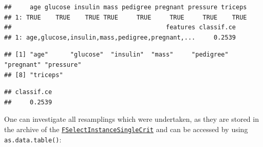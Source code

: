 \documentclass[
]{scrbook}
\newenvironment{Shaded}{\begin{snugshade}}{\end{snugshade}}
\newcommand{\CommentTok}[1]{\textcolor[rgb]{0.56,0.35,0.01}{\textit{#1}}}
\newcommand{\FunctionTok}[1]{\textcolor[rgb]{0.00,0.00,0.00}{#1}}
\newcommand{\NormalTok}[1]{#1}
\newcommand{\SpecialCharTok}[1]{\textcolor[rgb]{0.00,0.00,0.00}{#1}}
\newcommand{\StringTok}[1]{\textcolor[rgb]{0.31,0.60,0.02}{#1}}
\renewenvironment{Shaded} {\begin{snugshade}\small} {\end{snugshade}}
\begin{document}
\begin{Shaded}
\end{Shaded}

\begin{verbatim}
##     age glucose insulin mass pedigree pregnant pressure triceps
## 1: TRUE    TRUE    TRUE TRUE     TRUE     TRUE     TRUE    TRUE
##                                          features classif.ce
## 1: age,glucose,insulin,mass,pedigree,pregnant,...     0.2539
\end{verbatim}

\begin{Shaded}
\end{Shaded}

\begin{verbatim}
## [1] "age"      "glucose"  "insulin"  "mass"     "pedigree" "pregnant" "pressure"
## [8] "triceps"
\end{verbatim}

\begin{Shaded}
\end{Shaded}

\begin{verbatim}
## classif.ce 
##     0.2539
\end{verbatim}

One can investigate all resamplings which were undertaken, as they are stored in the archive of the \href{https://mlr3fselect.mlr-org.com/reference/FSelectInstanceSingleCrit.html}{\texttt{FSelectInstanceSingleCrit}} and can be accessed by using \texttt{as.data.table()}:

\begin{Shaded}
\end{Shaded}
\end{document}
